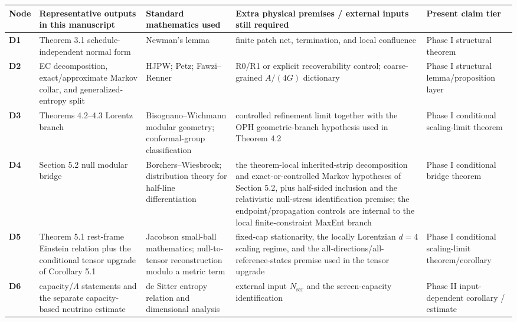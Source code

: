 \begingroup
\scriptsize
{\def\LTcaptype{none}
\setlength{\tabcolsep}{2pt}
\begin{longtable}[]{@{}>{\RaggedRight\arraybackslash}p{}>{\RaggedRight\arraybackslash}p{}>{\RaggedRight\arraybackslash}p{}>{\RaggedRight\arraybackslash}p{}>{\RaggedRight\arraybackslash}p{}@{}}
\toprule\noalign{}
Node & Representative outputs in this manuscript & Standard mathematics used & Extra physical premises / external inputs still required & Present claim tier \\
\midrule\noalign{}
\endhead
\bottomrule\noalign{}
\endlastfoot
\textbf{D1} & Theorem 3.1 schedule-independent normal form & Newman's lemma & finite patch net, termination, and local confluence & Phase I structural theorem \\
\textbf{D2} & EC decomposition, exact/approximate Markov collar, and generalized-entropy split & HJPW; Petz; Fawzi--Renner & R0/R1 or explicit recoverability control; coarse-grained \(A/(4G)\) dictionary & Phase I structural lemma/proposition layer \\
\textbf{D3} & Theorems 4.2--4.3 Lorentz branch & Bisognano--Wichmann modular geometry; conformal-group classification & controlled refinement limit together with the OPH geometric-branch hypothesis used in Theorem 4.2 & Phase I conditional scaling-limit theorem \\
\textbf{D4} & Section 5.2 null modular bridge & Borchers--Wiesbrock; distribution theory for half-line differentiation & the theorem-local inherited-strip decomposition and exact-or-controlled Markov hypotheses of Section 5.2, plus half-sided inclusion and the relativistic null-stress identification premise; the endpoint/propagation controls are internal to the local finite-constraint MaxEnt branch & Phase I conditional bridge theorem \\
\textbf{D5} & Theorem 5.1 rest-frame Einstein relation plus the conditional tensor upgrade of Corollary 5.1 & Jacobson small-ball mathematics; null-to-tensor reconstruction modulo a metric term & fixed-cap stationarity, the locally Lorentzian \(d=4\) scaling regime, and the all-directions/all-reference-states premise used in the tensor upgrade & Phase I conditional scaling-limit theorem/corollary \\
\textbf{D6} & capacity/\(\Lambda\) statements and the separate capacity-based neutrino estimate & de Sitter entropy relation and dimensional analysis & external input \(N_{\mathrm{scr}}\) and the screen-capacity identification & Phase II input-dependent corollary / estimate \\

\end{longtable}}
